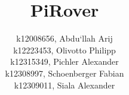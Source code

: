 \documentclass[12pt]{article}
\begin{document}
    \title{PiRover}

    \date{}
    \author{
        k12008656, Abdu`llah Arij\\
        k12223453, Olivotto Philipp\\
        k12315349, Pichler Alexander\\
        k12308997, Schoenberger Fabian\\
        k12309011, Siala Alexander
    }

    \maketitle
    \tableofcontents

    \newpage

    
    
    
    
    
    
    
    
\end{document}
